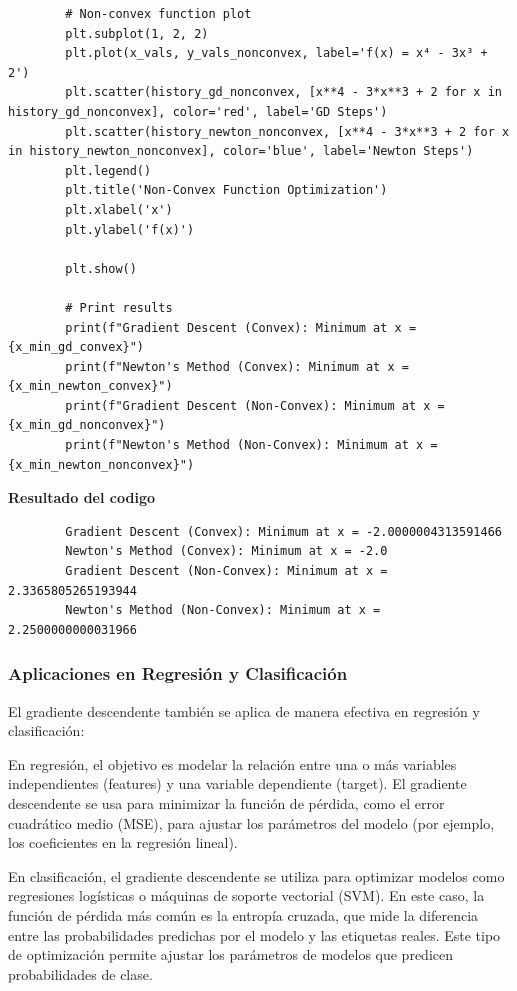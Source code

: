\documentclass{article}
\begin{document}
\begin{verbatim}
		# Non-convex function plot
		plt.subplot(1, 2, 2)
		plt.plot(x_vals, y_vals_nonconvex, label='f(x) = x⁴ - 3x³ + 2')
		plt.scatter(history_gd_nonconvex, [x**4 - 3*x**3 + 2 for x in history_gd_nonconvex], color='red', label='GD Steps')
		plt.scatter(history_newton_nonconvex, [x**4 - 3*x**3 + 2 for x in history_newton_nonconvex], color='blue', label='Newton Steps')
		plt.legend()
		plt.title('Non-Convex Function Optimization')
		plt.xlabel('x')
		plt.ylabel('f(x)')
		
		plt.show()
		
		# Print results
		print(f"Gradient Descent (Convex): Minimum at x = {x_min_gd_convex}")
		print(f"Newton's Method (Convex): Minimum at x = {x_min_newton_convex}")
		print(f"Gradient Descent (Non-Convex): Minimum at x = {x_min_gd_nonconvex}")
		print(f"Newton's Method (Non-Convex): Minimum at x = {x_min_newton_nonconvex}")
	\end{verbatim}
	
	\textbf{Resultado del codigo}
	\begin{verbatim}
		Gradient Descent (Convex): Minimum at x = -2.0000004313591466
		Newton's Method (Convex): Minimum at x = -2.0
		Gradient Descent (Non-Convex): Minimum at x = 2.3365805265193944
		Newton's Method (Non-Convex): Minimum at x = 2.2500000000031966
	\end{verbatim}
	
	\subsubsection{Aplicaciones en Regresión y Clasificación}
	
	El gradiente descendente también se aplica de manera efectiva en regresión y clasificación:
	
	En regresión, el objetivo es modelar la relación entre una o más variables independientes (features) y una variable dependiente (target). El gradiente descendente se usa para minimizar la función de pérdida, como el error cuadrático medio (MSE), para ajustar los parámetros del modelo (por ejemplo, los coeficientes en la regresión lineal).
	
	En clasificación, el gradiente descendente se utiliza para optimizar modelos como regresiones logísticas o máquinas de soporte vectorial (SVM). En este caso, la función de pérdida más común es la entropía cruzada, que mide la diferencia entre las probabilidades predichas por el modelo y las etiquetas reales. Este tipo de optimización permite ajustar los parámetros de modelos que predicen probabilidades de clase.
	
\end{document}
